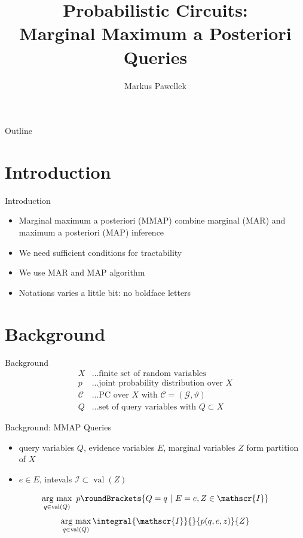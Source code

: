 \documentclass[aspectratio=169]{beamer}
\title{%
  Probabilistic Circuits: \\ Marginal Maximum a Posteriori Queries%
}
\author{Markus Pawellek}
\DeclareMathOperator*{\argmax}{arg\ max}
\DeclareMathOperator{\val}{val}
\begin{document}

\frame[plain]{\titlepage}
\begin{frame}[plain]{Outline}
  \footnotesize
  \hfill\parbox[t][7cm][l]{0.9\textwidth}{\tableofcontents}
\end{frame}
\setcounter{framenumber}{0}

\section{Introduction}
  \begin{frame}{Introduction}
    \begin{itemize}
      \item<+-> Marginal maximum a posteriori (MMAP) combine marginal (MAR) and maximum a posteriori (MAP) inference
      \item<+-> We need sufficient conditions for tractability
      \item<+-> We use MAR and MAP algorithm
      \item<+-> Notations varies a little bit: no boldface letters
    \end{itemize}
  \end{frame}

\section{Background}
  \begin{frame}{Background}
    \begin{align*}
      X &\ldots \text{finite set of random variables} \\
      p\, &\ldots \text{joint probability distribution over $X$} \\
      \mathscr{C}\, &\ldots \text{PC over $X$ with $\mathscr{C}=(\mathscr{G},ϑ)$} \\
      Q &\ldots \text{set of query variables with $Q\subset X$}
    \end{align*}
  \end{frame}

  \begin{frame}{Background: MMAP Queries}
    \begin{itemize}
      \item query variables $Q$, evidence variables $E$, marginal variables $Z$ form partition of $X$
      \item $e\in E$, intevals $\mathscr{I}\subset\val(Z)$
    \end{itemize}
    \begin{mybox}
      \[
        \argmax_{q\in\val(Q)} \ p\roundBrackets{Q=q \ | \ E=e,Z\in\mathscr{I}}
      \]
      \[
        \argmax_{q\in\val(Q)} \integral{\mathscr{I}}{}{p(q,e,z)}{Z}
      \]
    \end{mybox}
  \end{frame}
\end{document}
